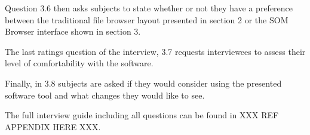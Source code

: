 \par
Question 3.6 then asks subjects to state whether or not they have a preference
between the traditional file browser layout presented in section 2 or the SOM
Browser interface shown in section 3.

\par
The last ratings question of the interview, 3.7 requests interviewees to assess
their level of comfortability with the software.

\par
Finally, in 3.8 subjects are asked if they would consider using the presented
software tool and what changes they would like to see.

\bigskip

The full interview guide including all questions can be found in
XXX REF APPENDIX HERE XXX.
